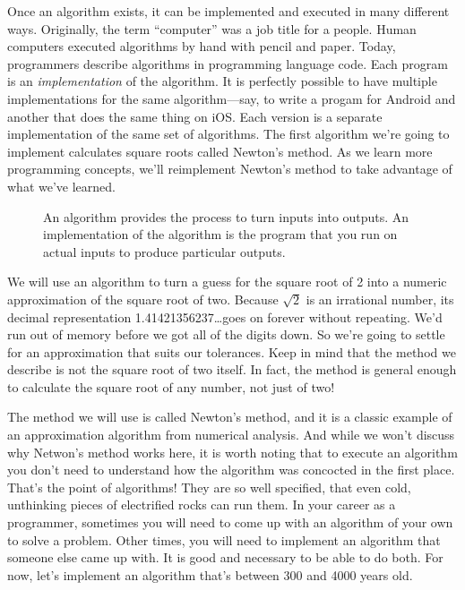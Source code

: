 Once an algorithm exists, it can be implemented and executed in many different ways. Originally, the term ``computer'' was a job title for a people. Human computers executed algorithms by hand with pencil and paper. Today, programmers describe algorithms in programming language code. Each program is an \emph{implementation} of the algorithm. It is perfectly possible to have multiple implementations for the same algorithm---say, to write a progam for Android and another that does the same thing on iOS. Each version is a separate implementation of the same set of algorithms. The first algorithm we're going to implement calculates square roots called Newton's method. As we learn more programming concepts, we'll reimplement Newton's method to take advantage of what we've learned.

\begin{figure}
  
  \caption{\label{fig:intro-algorithm-fundemental-diagram} An algorithm provides the process to turn inputs into outputs. An implementation of the algorithm is the program that you run on actual inputs to produce particular outputs.}
\end{figure}

We will use an algorithm to turn a guess for the square root of 2 into a numeric approximation of the square root of two. Because $\sqrt{2}$ is an irrational number, its decimal representation 1.41421356237\dots goes on forever without repeating. We'd run out of memory before we got all of the digits down. So we're going to settle for an approximation that suits our tolerances. Keep in mind that the method we describe is not the square root of two itself. In fact, the method is general enough to calculate the square root of any number, not just of two!

The method we will use is called Newton's method, and it is a classic example of an approximation algorithm from numerical analysis. And while we won't discuss why Netwon's method works here, it is worth noting that to execute an algorithm you don't need to understand how the algorithm was concocted in the first place. That's the point of algorithms! They are so well specified, that even cold, unthinking pieces of electrified rocks can run them. In your career as a programmer, sometimes you will need to come up with an algorithm of your own to solve a problem. Other times, you will need to implement an algorithm that someone else came up with. It is good and necessary to be able to do both. For now, let's implement an algorithm that's between 300 and 4000 years old.

